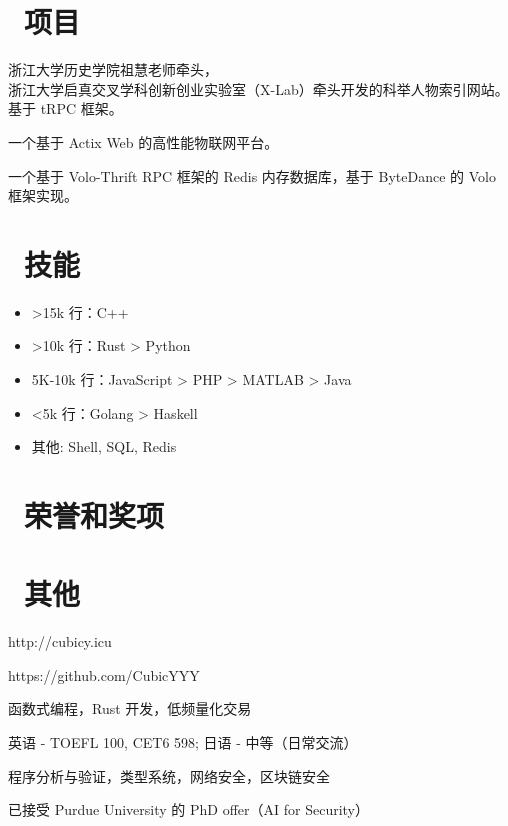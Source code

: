 \documentclass{resume}
\begin{document}
\section{\faFileCodeO\ 项目}
浙江大学历史学院祖慧老师牵头， \\ 
浙江大学启真交叉学科创新创业实验室（X-Lab）牵头开发的科举人物索引网站。\\
基于 tRPC 框架。

一个基于 Actix Web 的高性能物联网平台。

一个基于 Volo-Thrift RPC 框架的 Redis 内存数据库，基于 ByteDance 的 Volo 框架实现。

\section{\faCogs\ 技能}
\begin{itemize}[parsep=0.5ex]
  \item >15k 行：C++
  \item >10k 行：Rust > Python
  \item 5K-10k 行：JavaScript > PHP > MATLAB > Java
  \item <5k 行：Golang > Haskell
  \item 其他: Shell, SQL, Redis
\end{itemize}

\section{\faHeartO\ 荣誉和奖项}


\section{\faInfo\ 其他}
\begin{description}[parsep=0.5ex]
  \item[个人博客] http://cubicy.icu
  \item[GitHub] https://github.com/CubicYYY
  \item[技术兴趣] 函数式编程，Rust 开发，低频量化交易
  \item[语言能力] 英语 - TOEFL 100, CET6 598; 日语 - 中等（日常交流）
  \item[研究兴趣] 程序分析与验证，类型系统，网络安全，区块链安全
  \item[升学计划] 已接受 Purdue University 的 PhD offer（AI for Security）
\end{description}

%
%
\end{document}
